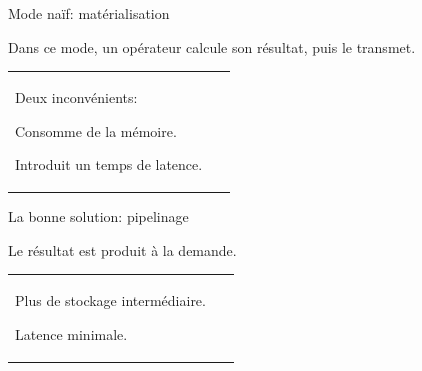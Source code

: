 \begin{frame}{Mode naïf: matérialisation}

Dans ce mode, un opérateur calcule son résultat, puis
le transmet.

\vfill


\vfill
\begin{tabular}{p{9cm}p{5cm}}
Deux inconvénients:

\begin{redbullet}
  \item Consomme de la mémoire.
  \item Introduit un temps de \alert{latence}.
\end{redbullet}

&
~
\end{tabular}
\end{frame}

\begin{frame}[fragile]{La bonne solution: pipelinage}

Le résultat est produit \alert{à la demande}.

\vfill


\vfill
\begin{tabular}{p{9cm}p{5cm}}
\begin{redbullet}
  \item \alert{Plus de stockage intermédiaire}.
  \item \alert{Latence minimale}.
\end{redbullet}
&
~
\end{tabular}
\end{frame}


